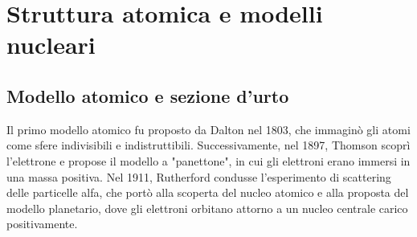 \chapter{Struttura atomica e modelli nucleari}
\section{Modello atomico e sezione d'urto}
Il primo modello atomico fu proposto da Dalton nel 1803, che immaginò gli atomi come sfere indivisibili e indistruttibili. Successivamente, nel 1897, Thomson scoprì l'elettrone e propose il modello a "panettone", in cui gli elettroni erano immersi in una massa positiva. Nel 1911, Rutherford condusse l'esperimento di scattering delle particelle alfa, che portò alla scoperta del nucleo atomico e alla proposta del modello planetario, dove gli elettroni orbitano attorno a un nucleo centrale carico positivamente.



